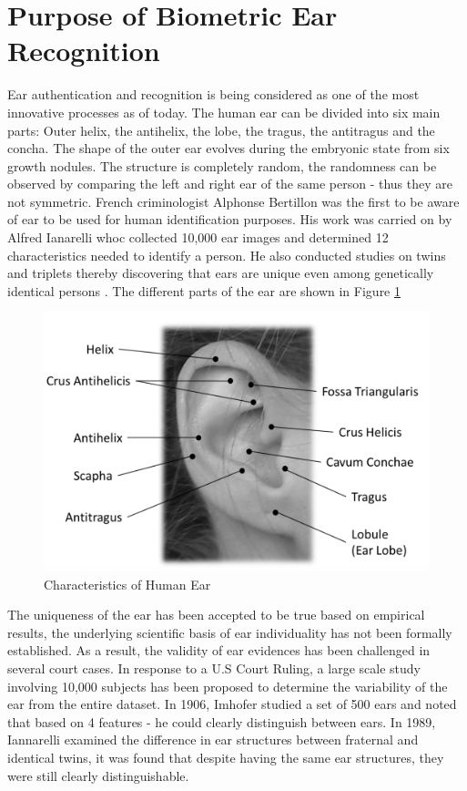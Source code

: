 \section{Purpose of Biometric Ear Recognition} 

Ear authentication and recognition is being considered as one of the most innovative processes as of today. The human ear can be divided into six main parts: Outer helix,
the antihelix, the lobe, the tragus, the antitragus and the concha. The shape of the outer ear evolves during the embryonic state from six growth nodules. The structure is completely random, the randomness can be observed by comparing the left and right ear of the same person - thus they are not symmetric. French criminologist Alphonse Bertillon was the first to be aware of ear to be used for human identification purposes. His work was carried on by Alfred Ianarelli whoc collected 10,000 ear images and determined 12 characteristics needed to identify a person. He also conducted studies on twins and triplets thereby discovering that ears are unique even among genetically identical persons \cite{pflug2012ear}. The different parts of the ear are shown in Figure \ref{fig:Figure2}

\begin{figure}[t]
	\includegraphics[width=\textwidth]{Figures/Figure2}
	\caption{Characteristics of Human Ear\cite{pflug2012ear}} 
	\label{fig:Figure2}
\end{figure}

The uniqueness of the ear has been accepted to be true based on empirical results, the underlying scientific basis of ear individuality has not been formally established. As a result, the validity of ear evidences has been challenged in several court cases. In response to a U.S Court Ruling, a large scale study involving 10,000 subjects has been proposed to determine the variability of the ear from the entire dataset. In 1906, Imhofer studied a set of 500 ears and noted that based on 4 features - he could clearly distinguish between ears. In 1989, Iannarelli\cite{Iannarelli} examined the difference in ear structures between fraternal and identical twins, it was found that despite having the same ear structures, they were still clearly distinguishable.

